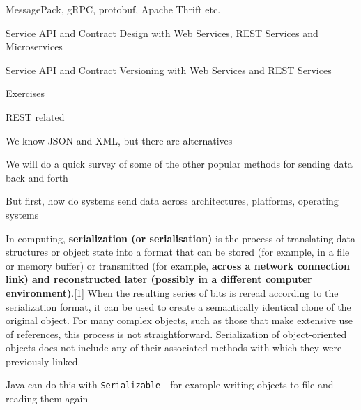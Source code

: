 \documentclass[Screen16to9,17pt]{foils}
\begin{document}

\begin{list2}
\item MessagePack, gRPC, protobuf, Apache Thrift etc.
\item Service API and Contract Design with Web Services, REST Services and Microservices
\item Service API and Contract Versioning with Web Services and REST Services
\end{list2}

Exercises
\begin{list2}
\item REST related
\item
\end{list2}




\begin{list2}
\item We know JSON and XML, but there are alternatives
\item We will do a quick survey of some of the other popular methods for sending data back and forth
\item But first, how do systems send data across architectures, platforms, operating systems
\end{list2}


\begin{quote}

\end{quote}
In computing, {\bf serialization (or serialisation)} is the process of translating data structures or object state into a format that can be stored (for example, in a file or memory buffer) or transmitted (for example, {\bf across a network connection link) and reconstructed later (possibly in a different computer environment)}.[1] When the resulting series of bits is reread according to the serialization format, it can be used to create a semantically identical clone of the original object. For many complex objects, such as those that make extensive use of references, this process is not straightforward. Serialization of object-oriented objects does not include any of their associated methods with which they were previously linked.
\begin{list2}
\item Java can do this with \verb+Serializable+ - for example writing objects to file and reading them again
\end{list2}
\end{document}
